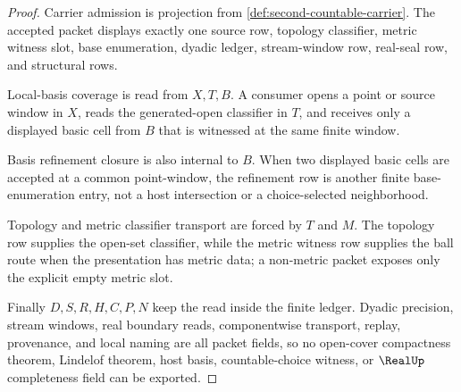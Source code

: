 \begin{proof}
Carrier admission is projection from \autoref{def:second-countable-carrier}. The accepted packet displays exactly one source row, topology classifier, metric witness slot, base enumeration, dyadic ledger, stream-window row, real-seal row, and structural rows.

Local-basis coverage is read from $X,T,B$. A consumer opens a point or source window in $X$, reads the generated-open classifier in $T$, and receives only a displayed basic cell from $B$ that is witnessed at the same finite window.

Basis refinement closure is also internal to $B$. When two displayed basic cells are accepted at a common point-window, the refinement row is another finite base-enumeration entry, not a host intersection or a choice-selected neighborhood.

Topology and metric classifier transport are forced by $T$ and $M$. The topology row supplies the open-set classifier, while the metric witness row supplies the ball route when the presentation has metric data; a non-metric packet exposes only the explicit empty metric slot.

Finally $D,S,R,H,C,P,N$ keep the read inside the finite ledger. Dyadic precision, stream windows, real boundary reads, componentwise transport, replay, provenance, and local naming are all packet fields, so no open-cover compactness theorem, Lindelof theorem, host basis, countable-choice witness, or $\RealUp$ completeness field can be exported.
\end{proof}

